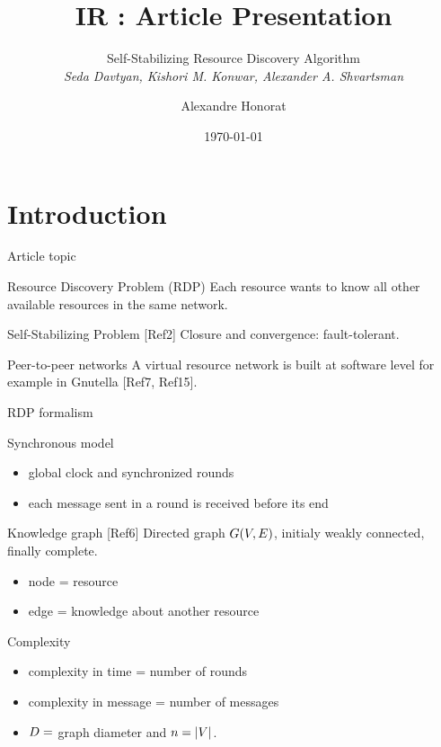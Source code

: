 \documentclass[10pt, compress]{beamer}
\title{IR : Article Presentation}
\subtitle{Self-Stabilizing Resource Discovery Algorithm\\\textit{Seda Davtyan, Kishori M. Konwar, Alexander A. Shvartsman}}
\date{\today}
\author{Alexandre Honorat}
\institute{University of Bordeaux Master RSM, supervised by Colette Johnen}
\begin{document}
\maketitle

\section{Introduction}


\begin{frame}{Article topic}

\begin{block}{Resource Discovery Problem (RDP)}
Each resource wants to know all other available resources in the same network.
\end{block}

\begin{block}{Self-Stabilizing Problem [Ref2]}
\alert{Closure} and \alert{convergence}: fault-tolerant.
\end{block}

\begin{exampleblock}{Peer-to-peer networks}
A virtual resource network is built at software level for example in \textsf{Gnutella} [Ref7, Ref15].
\end{exampleblock}

\end{frame}


\begin{frame}{RDP formalism}

\begin{block}{Synchronous model}
\begin{itemize}
\item global clock and synchronized rounds
\item each message sent in a round is received before its end
\end{itemize}
\end{block}

\begin{block}{Knowledge graph [Ref6]}
Directed graph $\mathnormal{G(V,E)}$, initialy weakly connected, \alert{finally complete}.  
\begin{itemize}
\item node = resource
\item edge = knowledge about another resource
\end{itemize}
\end{block}

\begin{block}{Complexity}
\begin{itemize}
\item complexity in time = number of rounds
\item complexity in message = number of messages
\item $\mathnormal{D} =$ graph diameter and $\mathnormal{n = |V|}$.
\end{itemize}
\end{block}

\end{frame}
\end{document}

